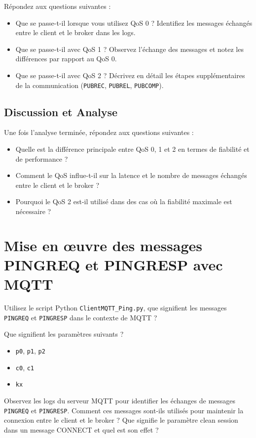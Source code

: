 \documentclass{article}
\begin{document}
Répondez aux questions suivantes :

\begin{itemize}
    \item Que se passe-t-il lorsque vous utilisez QoS 0 ? Identifiez les messages échangés entre le client et le broker dans les logs.
    \item Que se passe-t-il avec QoS 1 ? Observez l'échange des messages et notez les différences par rapport au QoS 0.
    \item Que se passe-t-il avec QoS 2 ? Décrivez en détail les étapes supplémentaires de la communication (\texttt{PUBREC}, \texttt{PUBREL}, \texttt{PUBCOMP}).
\end{itemize}

\subsection{Discussion et Analyse}

Une fois l'analyse terminée, répondez aux questions suivantes :
\begin{itemize}
    \item Quelle est la différence principale entre QoS 0, 1 et 2 en termes de fiabilité et de performance ?
    \item Comment le QoS influe-t-il sur la latence et le nombre de messages échangés entre le client et le broker ?
    \item Pourquoi le QoS 2 est-il utilisé dans des cas où la fiabilité maximale est nécessaire ?
\end{itemize}

\section{Mise en œuvre des messages PINGREQ et PINGRESP avec MQTT}

Utilisez le script Python \texttt{ClientMQTT\_Ping.py}, que signifient les messages \texttt{PINGREQ} et \texttt{PINGRESP} dans le contexte de MQTT ?

Que signifient les paramètres suivants ?

\begin{itemize}
    \item \texttt{p0}, \texttt{p1}, \texttt{p2}
    \item \texttt{c0}, \texttt{c1}
    \item \texttt{kx}
\end{itemize}

Observez les logs du serveur MQTT pour identifier les échanges de messages \texttt{PINGREQ} et \texttt{PINGRESP}. Comment ces messages sont-ils utilisés pour maintenir la connexion entre le client et le broker ?
Que signifie le paramètre clean session dans un message CONNECT et quel est son effet ?
\end{document}
